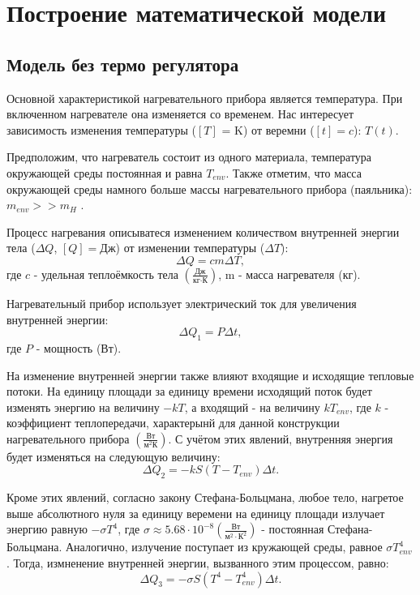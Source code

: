 \chapter{Построение математической модели}
\section{Модель без термо регулятора}
Основной характеристикой нагревательного прибора является температура. При включенном нагревателе она изменяется со временем. Нас интересует зависимость изменения температуры ($[T]$ = K) от веремни ($[t]=c$): $T(t)$.

Предположим, что нагреватель состоит из одного материала, температура окружающей среды постоянная и равна $T_{env}$. Также отметим, что масса окружающей среды намного больше массы нагревательного прибора (паяльника): $m_{env} >> m_H$ .

Процесс нагревания описыватеся изменением количеством внутренней энергии тела ($\Delta Q$, $[Q]=\text{Дж}$)  от изменении температуры ($\Delta T$):
\begin{equation}
	\Delta Q = cm\Delta T,
	\label{eq:heat_energy}
\end{equation}
где $c$ - удельная теплоёмкость тела $\left(\frac{\text{Дж}}{\text{кг}\cdot\text{К}}\right)$, m - масса нагревателя (кг).

Нагревательный прибор использует электрический ток для увеличения внутренней энергии:
\begin{equation}
	\Delta Q_1 = P \Delta t,
	\label{eq:electrical_energy}
\end{equation}
где $P$ - мощность (Вт).

На изменение внутренней энергии также влияют входящие и исходящие тепловые потоки.
На единицу площади за единицу времени исходящий поток будет изменять энергию на величину $-kT$, 
а входящий - на величину $kT_{env}$, где $k$ - коэффициент теплопередачи, характерынй для данной конструкции нагревательного прибора $\left(\frac{\text{Вт}}{\text{м}^2\text{К}}\right)$. С учётом этих явлений, внутренняя энергия будет изменяться на следующую величину:
\begin{equation}
	\Delta Q_2 = -kS(T-T_{env})\Delta t.
	\label{eq:heat_transfer}
\end{equation}

Кроме этих явлений, согласно закону Стефана-Больцмана, любое тело, нагретое выше абсолютного нуля за единицу веремени на единицу площади излучает энергию равную $-\sigma T^4$, где $\sigma \approx 5.68 \cdot 10 ^{-8} \left(\frac{\text{Вт}}{\text{м}^2\cdot\text{К}^2}\right) $ - постоянная Стефана-Больцмана. Аналогично, излучение поступает из кружающей среды, равное $\sigma T^4_{env}$.
Тогда, измненение внутренней энергии, вызванного этим процессом, равно:
\begin{equation}
	\Delta Q_3 = -\sigma S (T^4 - T^4_{env}) \Delta t.
	\label{eq:stefan_boltzmann}
\end{equation}

